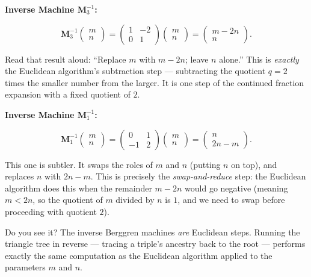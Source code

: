 \textbf{Inverse Machine \(\mathbf{M}_3^{-1}\):}

\[
\mathbf{M}_3^{-1} \begin{pmatrix} m \\ n \end{pmatrix} = \begin{pmatrix} 1 & -2 \\ 0 & 1 \end{pmatrix} \begin{pmatrix} m \\ n \end{pmatrix} = \begin{pmatrix} m - 2n \\ n \end{pmatrix}.
\]

Read that result aloud: ``Replace \(m\) with \(m - 2n\); leave \(n\) alone.'' This is \emph{exactly} the Euclidean algorithm's subtraction step --- subtracting the quotient \(q = 2\) times the smaller number from the larger. It is one step of the continued fraction expansion with a fixed quotient of \(2\).

\textbf{Inverse Machine \(\mathbf{M}_1^{-1}\):}

\[
\mathbf{M}_1^{-1} \begin{pmatrix} m \\ n \end{pmatrix} = \begin{pmatrix} 0 & 1 \\ -1 & 2 \end{pmatrix} \begin{pmatrix} m \\ n \end{pmatrix} = \begin{pmatrix} n \\ 2n - m \end{pmatrix}.
\]

This one is subtler. It swaps the roles of \(m\) and \(n\) (putting \(n\) on top), and replaces \(n\) with \(2n - m\). This is precisely the \emph{swap-and-reduce} step: the Euclidean algorithm does this when the remainder \(m - 2n\) would go negative (meaning \(m < 2n\), so the quotient of \(m\) divided by \(n\) is \(1\), and we need to swap before proceeding with quotient \(2\)).

Do you see it? The inverse Berggren machines \emph{are} Euclidean steps. Running the triangle tree in reverse --- tracing a triple's ancestry back to the root --- performs exactly the same computation as the Euclidean algorithm applied to the parameters \(m\) and \(n\).

